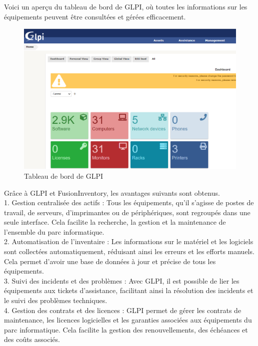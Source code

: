Voici un aperçu du tableau de bord de GLPI, où toutes les informations sur les équipements peuvent être consultées et gérées efficacement. \\

\begin{figure}[H]
\centering
\includegraphics[width=15cm]{Images/GLPI.png}
\caption{Tableau de bord de GLPI}
\label{fig:glpi-dashboard}
\end{figure}

Grâce à GLPI et FusionInventory, les avantages suivants sont obtenus. \\

1. Gestion centralisée des actifs : Tous les équipements, qu'il s'agisse de postes de travail, de serveurs, d'imprimantes ou de périphériques, sont regroupés dans une seule interface. Cela facilite la recherche, la gestion et la maintenance de l'ensemble du parc informatique. \\

2. Automatisation de l'inventaire : Les informations sur le matériel et les logiciels sont collectées automatiquement, réduisant ainsi les erreurs et les efforts manuels. Cela permet d'avoir une base de données à jour et précise de tous les équipements. \\

3. Suivi des incidents et des problèmes : Avec GLPI, il est possible de lier les équipements aux tickets d'assistance, facilitant ainsi la résolution des incidents et le suivi des problèmes techniques. \\

4. Gestion des contrats et des licences : GLPI permet de gérer les contrats de maintenance, les licences logicielles et les garanties associées aux équipements du parc informatique. Cela facilite la gestion des renouvellements, des échéances et des coûts associés. \\

